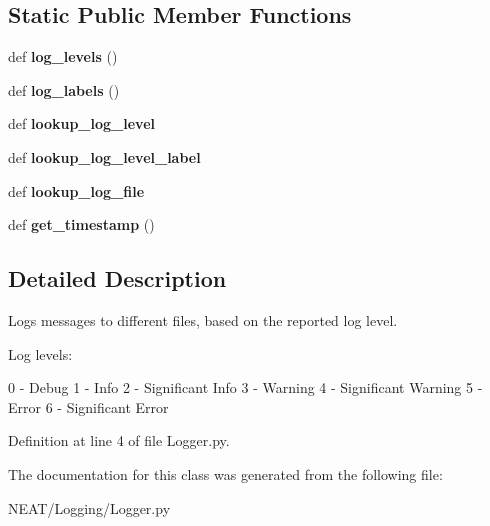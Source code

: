 \subsection*{Static Public Member Functions}
\begin{DoxyCompactItemize}
\item 
def {\bfseries log\+\_\+levels} ()\hypertarget{class_n_e_a_t___py_genetics_1_1_n_e_a_t_1_1_logging_1_1_logger_1_1_logger_abefae8d696e558dbcfe6d462ba412568}{}\label{class_n_e_a_t___py_genetics_1_1_n_e_a_t_1_1_logging_1_1_logger_1_1_logger_abefae8d696e558dbcfe6d462ba412568}

\item 
def {\bfseries log\+\_\+labels} ()\hypertarget{class_n_e_a_t___py_genetics_1_1_n_e_a_t_1_1_logging_1_1_logger_1_1_logger_a1078ad3713a23a85878a39da7450f208}{}\label{class_n_e_a_t___py_genetics_1_1_n_e_a_t_1_1_logging_1_1_logger_1_1_logger_a1078ad3713a23a85878a39da7450f208}

\item 
def {\bfseries lookup\+\_\+log\+\_\+level}\hypertarget{class_n_e_a_t___py_genetics_1_1_n_e_a_t_1_1_logging_1_1_logger_1_1_logger_a6b33597baed0f2c1efdb4a1d92043512}{}\label{class_n_e_a_t___py_genetics_1_1_n_e_a_t_1_1_logging_1_1_logger_1_1_logger_a6b33597baed0f2c1efdb4a1d92043512}

\item 
def {\bfseries lookup\+\_\+log\+\_\+level\+\_\+label}\hypertarget{class_n_e_a_t___py_genetics_1_1_n_e_a_t_1_1_logging_1_1_logger_1_1_logger_aea6ef2ac230f8c205a06ee2f3ad026e3}{}\label{class_n_e_a_t___py_genetics_1_1_n_e_a_t_1_1_logging_1_1_logger_1_1_logger_aea6ef2ac230f8c205a06ee2f3ad026e3}

\item 
def {\bfseries lookup\+\_\+log\+\_\+file}\hypertarget{class_n_e_a_t___py_genetics_1_1_n_e_a_t_1_1_logging_1_1_logger_1_1_logger_a6bdf29e33cd10e29df28e684ad55ac67}{}\label{class_n_e_a_t___py_genetics_1_1_n_e_a_t_1_1_logging_1_1_logger_1_1_logger_a6bdf29e33cd10e29df28e684ad55ac67}

\item 
def {\bfseries get\+\_\+timestamp} ()\hypertarget{class_n_e_a_t___py_genetics_1_1_n_e_a_t_1_1_logging_1_1_logger_1_1_logger_acb0c25d04b6f862dc358783264e29d66}{}\label{class_n_e_a_t___py_genetics_1_1_n_e_a_t_1_1_logging_1_1_logger_1_1_logger_acb0c25d04b6f862dc358783264e29d66}

\end{DoxyCompactItemize}


\subsection{Detailed Description}
\begin{DoxyVerb}Logs messages to different files, based
on the reported log level.

Log levels:

0 - Debug
1 - Info
2 - Significant Info
3 - Warning
4 - Significant Warning
5 - Error
6 - Significant Error
\end{DoxyVerb}
 

Definition at line 4 of file Logger.\+py.



The documentation for this class was generated from the following file\+:\begin{DoxyCompactItemize}
\item 
N\+E\+A\+T/\+Logging/Logger.\+py\end{DoxyCompactItemize}
